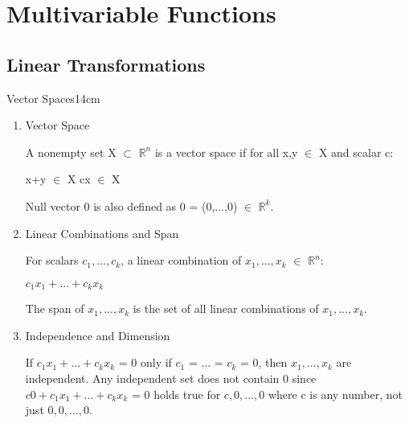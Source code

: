 \newpage

\section[Day 7: Multivariable Functions]{ Multivariable Functions }

\subsection{ Linear Transformations }

    \begin{definition}{Vector Spaces}{14cm}
        \begin{enumerate}[label=(\alph*), leftmargin=0.5cm, itemsep=0.1cm]
            \item {\color{lblue} Vector Space}
            
                A nonempty set X $\subset$ $\mathbb{R}^n$ is a vector space if
                for all x,y $\in$ X and scalar c:
        
                \hspace{0.5cm}
                x+y $\in$ X
                \hspace{1cm}
                cx $\in$ X

                Null vector 0 is also defined as 0 = (0,...,0) $\in$ $\mathbb{R}^k$.
            
            \item {\color{lblue} Linear Combinations and Span}
            
                For scalars $c_1,...,c_k$, a linear combination of
                $x_1,...,x_k$ $\in$ $\mathbb{R}^n$:
        
                \hspace{0.5cm}
                $c_1x_1 + ... + c_kx_k$
        
                The span of $x_1,...,x_k$ is the set of all linear combinations
                of $x_1,...,x_k$.

            \item {\color{lblue} Independence and Dimension}
                
                If $c_1x_1 + ... + c_kx_k$ = 0 only if $c_1$ = ... = $c_k$ = 0,
                then $x_1,...,x_k$ are independent.
                Any independent set does not contain 0 since
                $c0 + c_1x_1 + ... + c_kx_k$ = 0 holds true for
                $c,0,...,0$ where c is any number, not just $0,0,...,0$.


\end{enumerate}
\end{definition}

